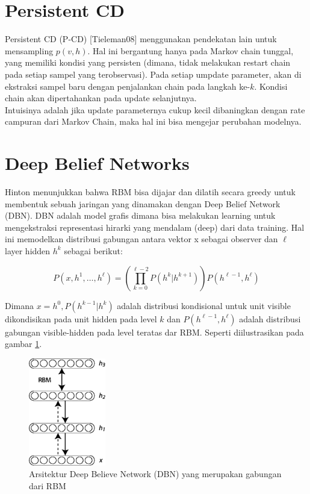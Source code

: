 \documentclass[12pt]{article}
\begin{document}
\section{Persistent CD}

Persistent CD (P-CD) [Tieleman08] menggunakan pendekatan lain untuk mensampling $p(v,h)$. Hal ini bergantung hanya pada Markov chain tunggal, yang memiliki kondisi yang persisten (dimana, tidak melakukan restart chain pada setiap sampel yang terobservasi). Pada setiap umpdate parameter, akan di ekstraksi sampel baru dengan penjalankan chain pada langkah ke-$k$. Kondisi chain akan dipertahankan pada update selanjutnya.\\
Intuisinya adalah jika update parameternya cukup kecil dibaningkan dengan rate campuran dari Markov Chain, maka hal ini bisa mengejar perubahan modelnya.

\section{Deep Belief Networks}

Hinton menunjukkan bahwa RBM bisa dijajar dan dilatih secara greedy untuk membentuk sebuah jaringan yang dinamakan dengan Deep Belief Network (DBN). DBN adalah model grafis dimana bisa melakukan learning untuk mengekstraksi representasi hirarki yang mendalam (deep) dari data training. Hal ini memodelkan distribusi gabungan antara vektor x sebagai observer dan $\ell$ layer hidden $h^k$ sebagai berikut:

\begin{equation}
P(x, h^1, \ldots, h^{\ell}) = \left(\prod_{k=0}^{\ell-2} P(h^k|h^{k+1})\right) P(h^{\ell-1},h^{\ell})
\end{equation}

Dimana $x=h^0, P(h^{k-1} | h^k)$ adalah distribusi kondisional untuk unit visible dikondisikan pada unit hidden pada level $k$ dan  $P(h^{\ell-1}, h^{\ell})$ adalah distribusi gabungan visible-hidden pada level teratas dar RBM. Seperti diilustrasikan pada gambar \ref{fig:dbn3}.

\begin{figure}
	\centering
	\includegraphics[width=0.3\textwidth]
		{pics/DBN3.png}
	\caption{Arsitektur Deep Believe Network (DBN) yang merupakan gabungan dari RBM}
	\label{fig:dbn3}
\end{figure}
\end{document}

